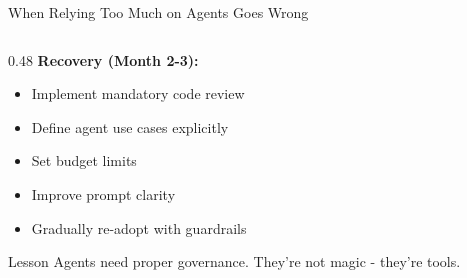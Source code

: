 \documentclass[aspectratio=169,11pt]{beamer}
\begin{document}
\begin{frame}{When Relying Too Much on Agents Goes Wrong}
\begin{columns}[T]
\begin{column}{0.48\textwidth}
            \vspace{0.3cm}
            \textbf{Recovery (Month 2-3):}
            \begin{itemize}
                \item Implement mandatory code review
                \item Define agent use cases explicitly
                \item Set budget limits
                \item Improve prompt clarity
                \item Gradually re-adopt with guardrails
            \end{itemize}

            \begin{alertblock}{Lesson}
                Agents need proper governance. They're not magic - they're tools.
            \end{alertblock}
        \end{column}
    \end{columns}
\end{frame}
\end{document}
